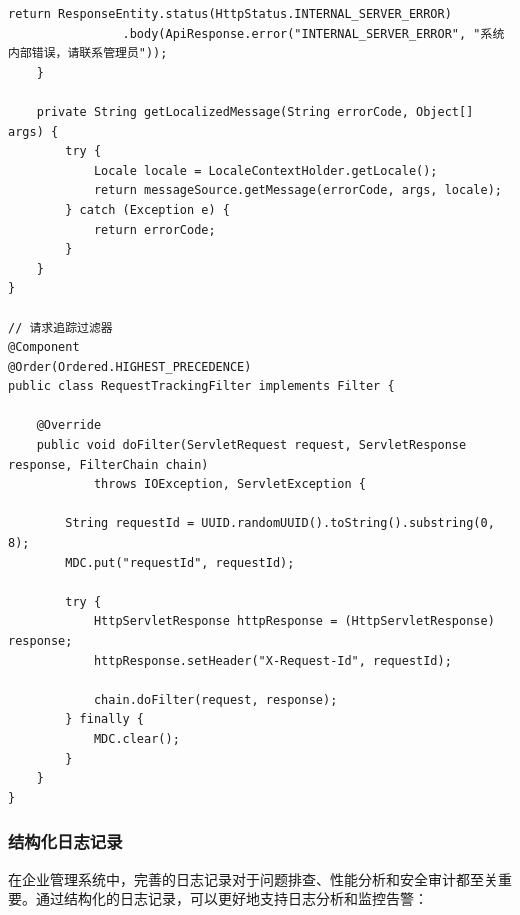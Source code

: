 \begin{lstlisting}[style=java]
        return ResponseEntity.status(HttpStatus.INTERNAL_SERVER_ERROR)
                .body(ApiResponse.error("INTERNAL_SERVER_ERROR", "系统内部错误，请联系管理员"));
    }
    
    private String getLocalizedMessage(String errorCode, Object[] args) {
        try {
            Locale locale = LocaleContextHolder.getLocale();
            return messageSource.getMessage(errorCode, args, locale);
        } catch (Exception e) {
            return errorCode;
        }
    }
}

// 请求追踪过滤器
@Component
@Order(Ordered.HIGHEST_PRECEDENCE)
public class RequestTrackingFilter implements Filter {
    
    @Override
    public void doFilter(ServletRequest request, ServletResponse response, FilterChain chain) 
            throws IOException, ServletException {
        
        String requestId = UUID.randomUUID().toString().substring(0, 8);
        MDC.put("requestId", requestId);
        
        try {
            HttpServletResponse httpResponse = (HttpServletResponse) response;
            httpResponse.setHeader("X-Request-Id", requestId);
            
            chain.doFilter(request, response);
        } finally {
            MDC.clear();
        }
    }
}
\end{lstlisting}

\hypertarget{ux7ed3ux6784ux5316ux65e5ux5fd7ux8bb0ux5f55}{%
\subsubsection{结构化日志记录}\label{ux7ed3ux6784ux5316ux65e5ux5fd7ux8bb0ux5f55}}

在企业管理系统中，完善的日志记录对于问题排查、性能分析和安全审计都至关重要。通过结构化的日志记录，可以更好地支持日志分析和监控告警：

